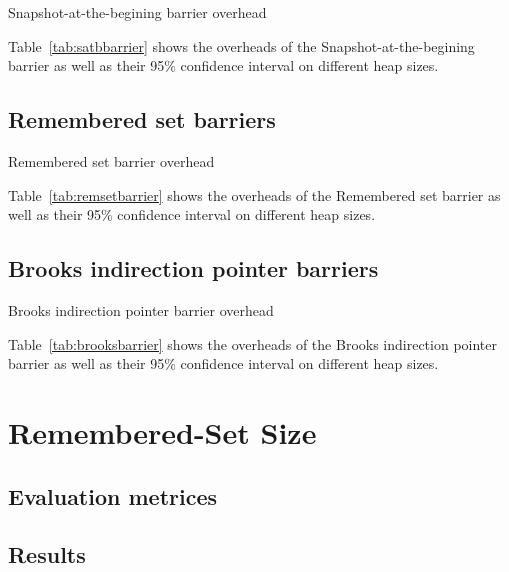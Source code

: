 \begin{table*}
  \centering
  
  \caption{Snapshot-at-the-begining barrier overhead}
  \label{tab:satbbarrier}
\end{table*}

Table~\ref{tab:satbbarrier} shows the overheads of the Snapshot-at-the-begining barrier
as well as their 95\% confidence interval on different heap sizes.


\subsection{Remembered set barriers}

\begin{table*}
  \centering
  
  \caption{Remembered set barrier overhead}
  \label{tab:remsetbarrier}
\end{table*}

Table~\ref{tab:remsetbarrier} shows the overheads of the Remembered set barrier
as well as their 95\% confidence interval on different heap sizes.


\subsection{Brooks indirection pointer barriers}

\begin{table*}
  \centering
  
  \caption{Brooks indirection pointer barrier overhead}
  \label{tab:brooksbarrier}
\end{table*}

Table~\ref{tab:brooksbarrier} shows the overheads of the Brooks indirection pointer barrier
as well as their 95\% confidence interval on different heap sizes.


\section{Remembered-Set Size} %
\label{sec:remsetsize}

\subsection{Evaluation metrices}
\subsection{Results}

